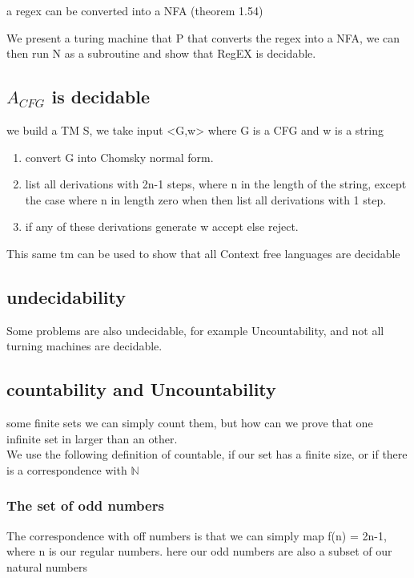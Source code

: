 \documentclass[a4paper,10pt,titlepage]{report}
\begin{document}
a regex can be converted into a NFA (theorem 1.54)

We present a turing machine that P that converts the regex into a NFA, we can then run N as a subroutine and show that RegEX is decidable.

\subsection{$A_{CFG}$ is decidable}
we build a TM S, we take input <G,w> where G is a CFG and w is a string\\

\begin{enumerate}
\item convert G into Chomsky normal form.
\item list all derivations with 2n-1 steps,  where n in the length of the string, except the case where n in length zero when then list all derivations with 1 step.\
\item if any of these derivations generate w accept else reject.\\
\end{enumerate}

This same tm can be used to show that all Context free languages are decidable\

\subsection{undecidability}
Some problems are also undecidable, for example Uncountability, and not all turning machines are decidable.
\subsection{countability and Uncountability}
some finite sets we can simply count them, but how can we prove that one infinite set in larger than an other.\\
We use the following definition of countable, if our set has a finite size, or if there is a correspondence with $\mathbb{N}$\\

\subsubsection{The set of odd numbers}

The correspondence with off numbers is that we can simply map f(n) = 2n-1, where n is our regular numbers. here our odd numbers are also a subset of our natural numbers
\end{document}
